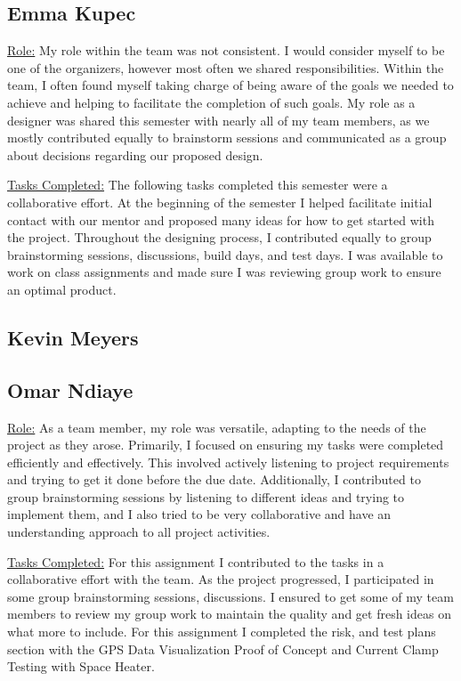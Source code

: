 \subsection{Emma Kupec}
\underline{Role:} My role within the team was not consistent. 
I would consider myself to be one of the organizers, however most often we shared responsibilities. 
Within the team, I often found myself taking charge of being aware of the goals we needed to achieve and helping to facilitate the completion of such goals. 
My role as a designer was shared this semester with nearly all of my team members, as we mostly contributed equally to brainstorm sessions and communicated as a group about decisions regarding our proposed design.

\underline{Tasks Completed:} The following tasks completed this semester were a collaborative effort. 
At the beginning of the semester I helped facilitate initial contact with our mentor and proposed many ideas for how to get started with the project. 
Throughout the designing process, I contributed equally to group brainstorming sessions, discussions, build days, and test days. 
I was available to work on class assignments and made sure I was reviewing group work to ensure an optimal product.

\subsection{Kevin Meyers}

\subsection{Omar Ndiaye}
\underline{Role:} As a team member, my role was versatile, adapting to the needs of the project as they arose. 
Primarily, I focused on ensuring my tasks were completed efficiently and effectively. 
This involved actively listening to project requirements and trying to get it done before the due date. 
Additionally, I contributed to group brainstorming sessions by listening to different ideas and trying to implement them, and I also tried to be very collaborative and have an understanding approach to all project activities.

\underline{Tasks Completed:} For this assignment I contributed to the tasks in a collaborative effort with the team. 
As the project progressed, I participated in some group brainstorming sessions, discussions. 
I ensured to get some of my team members to review my group work to maintain the quality and get fresh ideas on what more to include. 
For this assignment I completed the risk, and test plans section with the GPS Data Visualization Proof of Concept and Current Clamp Testing with Space Heater.


